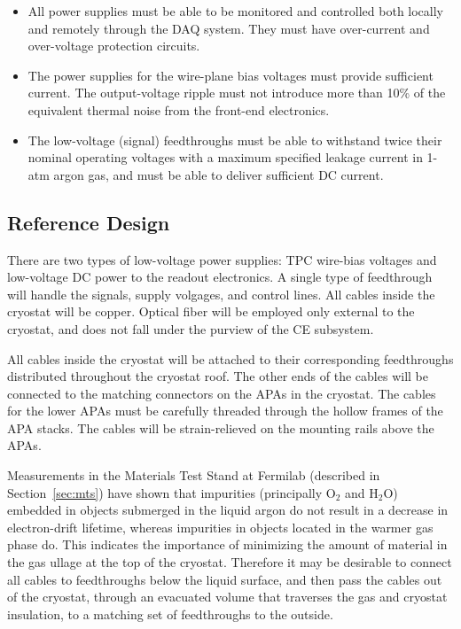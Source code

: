 \begin{itemize}
\item All power supplies must be able to be monitored and 
controlled both locally and remotely through the DAQ system.  
They must have over-current and over-voltage protection circuits.
\item The power supplies for the wire-plane bias voltages
must provide sufficient current.   The output-voltage ripple 
must not introduce more than 10\% of the equivalent thermal noise from the front-end electronics. 
\item The low-voltage (signal) feedthroughs must be able to withstand twice their nominal operating voltages 
with a maximum specified leakage current in 1-atm argon gas, and must be able to deliver sufficient DC current.
\end{itemize}

\subsection{Reference Design} 
\label{subsec:ce-feedthru-desc}

There are two types of low-voltage power supplies:
TPC wire-bias voltages and low-voltage DC power to the readout electronics.
A single type of feedthrough will handle the signals, supply volgages, and control lines.
All cables inside the cryostat will be copper.
Optical fiber will be employed only external to the cryostat, and does not fall under the purview of the CE subsystem.

All cables inside the cryostat will be attached to their corresponding feedthroughs distributed throughout the cryostat roof.
The other ends of the cables will be connected to the matching connectors on the APAs in the cryostat.
The cables for the lower APAs must be carefully threaded through the hollow frames of the APA stacks.
The cables will be strain-relieved on the  mounting rails above the APAs. 

Measurements in the Materials Test Stand at Fermilab (described in Section~\ref{sec:mts})
have shown that impurities (principally O$_2$ and H$_2$O) embedded in objects submerged in the liquid argon do not result
in a decrease in electron-drift lifetime, whereas impurities in objects located in the warmer gas phase do.
This indicates the importance of minimizing the amount of material in the gas ullage at the top of the cryostat.
Therefore it may be desirable to connect all cables to feedthroughs below the liquid surface,
and then pass the cables out of the cryostat, through an evacuated volume that traverses the gas and cryostat insulation,
to a matching set of feedthroughs to the outside. 

